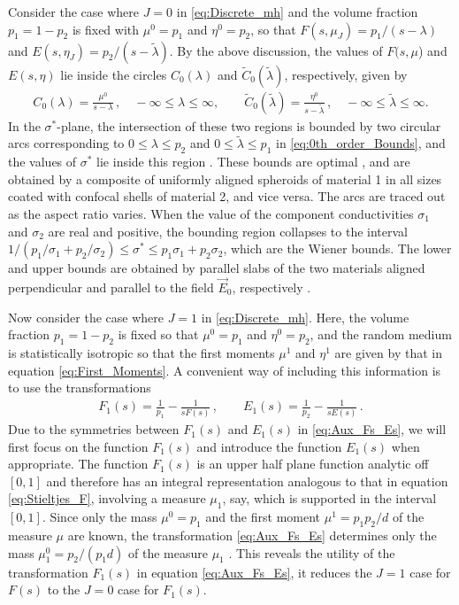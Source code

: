 \documentclass{cmslatex}
\begin{document}
Consider the case where $J=0$  in \eqref{eq:Discrete_mh} and the
volume fraction $p_1=1-p_2$ is fixed with $\mu^0=p_1$ and
$\eta^0=p_2$, so that $F(s,\mu_J)=p_1/(s-\lambda)$ and
$E(s,\eta_J)=p_2/(s-\tilde{\lambda})$. By the above discussion, the values of 
$F(s,\mu$) and $E(s,\eta)$ lie inside the circles $C_0(\lambda)$ and
$\tilde{C}_0(\tilde{\lambda})$, respectively, given by  
%
\begin{align}\label{eq:0th_order_Bounds}
    C_0(\lambda)=\frac{\mu^0}{s-\lambda}\,, \quad -\infty\leq\lambda\leq \infty, \qquad
    \tilde{C}_0(\tilde{\lambda})=\frac{\eta^0}{s-\tilde{\lambda}}\,, \quad
    -\infty\leq\tilde{\lambda}\leq \infty. 
\end{align}
%
In the $\sigma^*$-plane, the intersection of these two regions is bounded by
two circular arcs corresponding to $0\leq\lambda\leq p_2$ and $0\leq\tilde{\lambda}\leq p_1$
in \eqref{eq:0th_order_Bounds}, and the values of $\sigma^*$ lie inside
this region \cite{Golden:JMPS-333}. These bounds are optimal
\cite{Milton:JAP-5286,Bergman:AP-78}, and are obtained by a composite
of uniformly aligned spheroids of material 1 in all sizes coated with
confocal shells of material 2, and vice versa. The arcs are traced out
as the aspect ratio varies. When the value of the component
conductivities $\sigma_1$ and $\sigma_2$ are real and positive, the bounding
region collapses to the interval
$1/(p_1/\sigma_1+p_2/\sigma_2)\leq\sigma^*\leq p_1\sigma_1+p_2\sigma_2$, which are the Wiener
bounds. The lower and upper bounds are obtained by parallel slabs of
the two materials aligned perpendicular and parallel to the field
$\vec{E}_0$, respectively \cite{Scaife-1989}.



Now consider the case where $J=1$ in
\eqref{eq:Discrete_mh}. Here, the volume fraction $p_1=1-p_2$ is
fixed so that $\mu^0=p_1$ and $\eta^0=p_2$, and the random medium is
statistically isotropic so that the first moments $\mu^1$ and $\eta^1$ are
given by that in equation \eqref{eq:First_Moments}.  A convenient way
of including this information is to use the transformations
\cite{Bergman:AP-78}  
%
\begin{align}\label{eq:Aux_Fs_Es}
  F_1(s)=\frac{1}{p_1}-\frac{1}{sF(s)}\,, \qquad
  E_1(s)=\frac{1}{p_2}-\frac{1}{sE(s)}\,.
\end{align}
%
Due to the symmetries between $F_1(s)$ and $E_1(s)$ in
\eqref{eq:Aux_Fs_Es}, we will first focus on the function $F_1(s)$ and
introduce the function $E_1(s)$ when appropriate. The function
$F_1(s)$ is an upper half plane function analytic off $[0,1]$ and
therefore has an integral representation
\cite{Bergman:AP-78,Golden:JMPS-333} analogous to that in equation
\eqref{eq:Stieltjes_F}, involving a
measure $\mu_1$, say, which is supported in the interval $[0,1]$. Since
only the mass $\mu^0=p_1$ and the first moment $\mu^1=p_1p_2/d$ of the
measure $\mu$ are known, the transformation \eqref{eq:Aux_Fs_Es}
determines only the mass $\mu_1^0=p_2/(p_1d)$ of the measure $\mu_1$
\cite{Bergman:AP-78,Golden:JMPS-333}. This reveals the utility of the
transformation $F_1(s)$ in equation \eqref{eq:Aux_Fs_Es}, it reduces the 
$J=1$ case for $F(s)$ to the $J=0$ case for $F_1(s)$.
\end{document}
